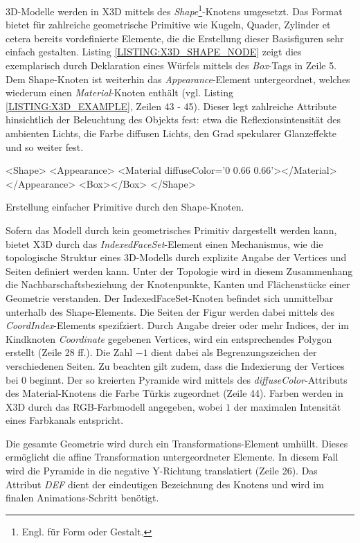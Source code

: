 3D-Modelle werden in X3D mittels des \textit{Shape}\footnote{Engl. für Form oder Gestalt.}-Knotens umgesetzt. Das Format bietet für zahlreiche geometrische Primitive wie Kugeln, Quader, Zylinder et cetera bereits vordefinierte Elemente, die die Erstellung dieser Basisfiguren sehr einfach gestalten. Listing \ref{LISTING:X3D_SHAPE_NODE} zeigt dies exemplarisch durch Deklaration eines Würfels mittels des \textit{Box}-Tags in Zeile 5. Dem Shape-Knoten ist weiterhin das \textit{Appearance}-Element untergeordnet, welches wiederum einen \textit{Material}-Knoten enthält (vgl. Listing \ref{LISTING:X3D_EXAMPLE}, Zeilen 43 - 45). Dieser legt zahlreiche Attribute hinsichtlich der Beleuchtung des Objekts fest: etwa die Reflexionsintensität des ambienten Lichts, die Farbe diffusen Lichts, den Grad spekularer Glanzeffekte und so weiter fest.

\smallskip
\begin{listing}[!h]
\begin{htmlcode}
<Shape>
	<Appearance>
		<Material diffuseColor='0 0.66 0.66'></Material>
	</Appearance>
	<Box></Box>
</Shape>
\end{htmlcode}
\caption{Erstellung einfacher Primitive durch den Shape-Knoten.}
\label{LISTING:X3D_SHAPE_NODE}
\end{listing}

Sofern das Modell durch kein geometrisches Primitiv dargestellt werden kann, bietet X3D durch das \textit{IndexedFaceSet}-Element einen Mechanismus, wie die topologische Struktur eines 3D-Modells durch explizite Angabe der Vertices und Seiten definiert werden kann. Unter der Topologie wird in diesem Zusammenhang die Nachbarschaftsbeziehung der Knotenpunkte, Kanten und Flächenstücke einer Geometrie verstanden. Der IndexedFaceSet-Knoten befindet sich unmittelbar unterhalb des Shape-Elements.
Die Seiten der Figur werden dabei mittels des \textit{CoordIndex}-Elements spezifziert. Durch Angabe dreier oder mehr Indices, der im Kindknoten \textit{Coordinate} gegebenen Vertices, wird ein entsprechendes Polygon erstellt (Zeile 28 ff.). Die Zahl $-1$ dient dabei als Begrenzungszeichen der verschiedenen Seiten. Zu beachten gilt zudem, dass die Indexierung der Vertices bei $0$ beginnt.
Der so kreierten Pyramide wird mittels des \textit{diffuseColor}-Attributs des Material-Knotens die Farbe Türkis zugeordnet (Zeile 44). Farben werden in X3D durch das RGB-Farbmodell angegeben, wobei $1$ der maximalen Intensität eines Farbkanals entspricht.

Die gesamte Geometrie wird durch ein Transformations-Element umhüllt. Dieses ermöglicht die affine Transformation untergeordneter Elemente. In diesem Fall wird die Pyramide in die negative Y-Richtung translatiert (Zeile 26). Das Attribut \textit{DEF} dient der eindeutigen Bezeichnung des Knotens und wird im finalen Animations-Schritt benötigt.

